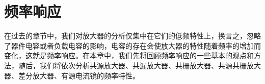 \chapter{频率响应}

在过去的章节中，我们对放大器的分析仅集中在它们的低频特性上，换言之，忽略了器件电容或者负载电容的影响，电容的存在会使放大器的特性随着频率的增加而变化，这就是频率响应。在本章中，我们先将回顾频率响应的一些基本的观点和方法，随后，我们将依次分析共源放大器、共漏放大器、共栅放大器、共源共栅放大器、差分放大器、有源电流镜的频率特性。

